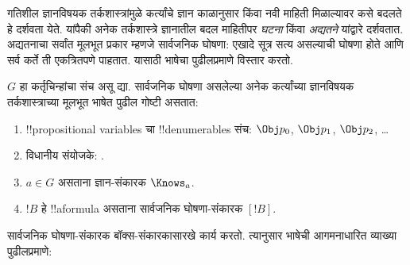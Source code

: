 \documentclass[../../../include/open-logic-section]{subfiles}
\begin{document}


गतिशील ज्ञानविषयक तर्कशास्त्रांमुळे कर्त्यांचे ज्ञान
काळानुसार किंवा नवी माहिती मिळाल्यावर कसे बदलते हे
दर्शवता येते. यांपैकी अनेक तर्कशास्त्रे ज्ञानातील बदल
माहितीपर \emph{घटना} किंवा \emph{अद्यतने} यांद्वारे
दर्शवतात. अद्यतनाचा सर्वांत मूलभूत प्रकार म्हणजे
सार्वजनिक घोषणा: एखादे सूत्र सत्य असल्याची घोषणा
होते आणि सर्व कर्ते ती एकत्रितपणे पाहतात. यासाठी
भाषेचा पुढीलप्रमाणे विस्तार करतो.

\begin{defn}
$G$ हा कर्तृचिन्हांचा संच असू द्या. सार्वजनिक घोषणा
असलेल्या अनेक कर्त्यांच्या ज्ञानविषयक तर्कशास्त्राच्या
मूलभूत भाषेत पुढील गोष्टी असतात:
\begin{enumerate}
  \item !!{propositional variable}s चा !!{denumerable}s संच: $\Obj
    p_0$, $\Obj p_1$, $\Obj p_2$, \dots
  \item विधानीय संयोजके: \startycommalist
  .
  \item $a \in G$ असताना ज्ञान-संकारक $\Knows_a$.
  \item $!B$ हे !!a{formula} असताना सार्वजनिक घोषणा-संकारक $[!B]$.
\end{enumerate}
\end{defn}

सार्वजनिक घोषणा-संकारक बॉक्स-संकारकासारखे कार्य
करतो. त्यानुसार भाषेची आगमनाधारित व्याख्या पुढीलप्रमाणे:
\end{document}
